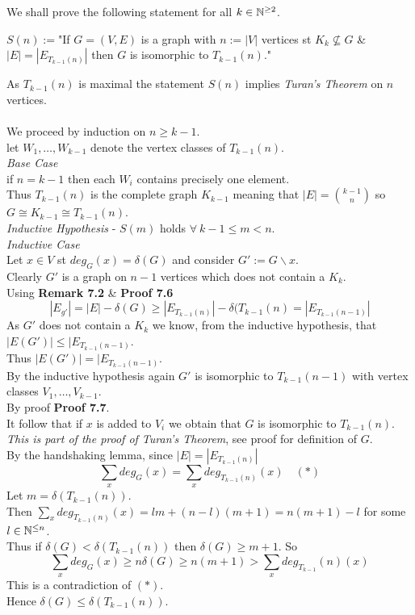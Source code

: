 \documentclass[11pt,a4paper]{article}
\begin{document}
We shall prove the following statement for all $k\in\mathbb{N}^{\geq2}$.
\begin{center}
$S(n):=$"If $G=(V,E)$ is a graph with $n:=|V|$ vertices st $K_k\not\subseteq G$ \& $|E|=|E_{T_{k-1}(n)}|$ then $G$ is isomorphic to $T_{k-1}(n)$."
\end{center}
As $T_{k-1}(n)$ is maximal the statement $S(n)$ implies \textit{Turan's Theorem} on $n$ vertices.\\
\\
We proceed by induction on $n\geq k-1$.\\
let $W_1,\dots,W_{k-1}$ denote the vertex classes of $T_{k-1}(n)$.\\
\textit{Base Case}\\
if $n=k-1$ then each $W_i$ contains precisely one element.\\
Thus $T_{k-1}(n)$ is the complete graph $K_{k-1}$ meaning that $|E|={k-1\choose n}$ so $G\cong K_{k-1}\cong T_{k-1}(n)$.\\
\textit{Inductive Hypothesis} - $S(m)$ holds $\forall\ k-1\leq m<n$.\\
\textit{Inductive Case}\\
Let $x\in V$ st $deg_G(x)=\delta(G)$ and consider $G':=G\backslash x$.\\
Clearly $G'$ is a graph on $n-1$ vertices which does not contain a $K_k$.\\
Using \textbf{Remark 7.2} \& \textbf{Proof 7.6}
$$|E_{g'}|=|E|-\delta(G)\geq|E_{T_{k-1}(n)}|-\delta(T_{k-1}(n)=|E_{T_{k-1}(n-1)}|$$
As $G'$ does not contain a $K_k$ we know, from the inductive hypothesis, that $|E(G')|\leq|E_{T_{k-1}(n-1)}$.\\
Thus $|E(G')|=|E_{T_{k-1}(n-1)}$.\\
By the inductive hypothesis again $G'$ is isomorphic to $T_{k-1}(n-1)$ with vertex classes $V_1,\dots,V_{k-1}$.\\
By proof \textbf{Proof 7.7}.\\
It follow that if $x$ is added to $V_i$ we obtain that $G$ is isomorphic to $T_{k-1}(n)$.\\

\textit{This is part of the proof of Turan's Theorem}, see proof for definition of $G$.\\
By the handshaking lemma, since $|E|=|E_{T_{k-1}(n)}|$
$$\sum_xdeg_G(x)=\sum_xdeg_{T_{k-1}(n)}(x)\quad(*)$$
Let $m=\delta(T_{k-1}(n))$.\\
Then $\sum_xdeg_{T_{k-1}(n)}(x)=lm+(n-l)(m+1)=n(m+1)-l$ for some $l\in\mathbb{N}^{\leq n}$.\\
Thus if $\delta(G)<\delta(T_{k-1}(n))$ then $\delta(G)\geq m+1$. So
$$\sum_xdeg_G(x)\geq n\delta(G)\geq n(m+1)>\sum_xdeg_{T_{k-1}}(n)(x)$$
This is a contradiction of $(*)$.\\
Hence $\delta(G)\leq\delta(T_{k-1}(n))$.\\
\end{document}
